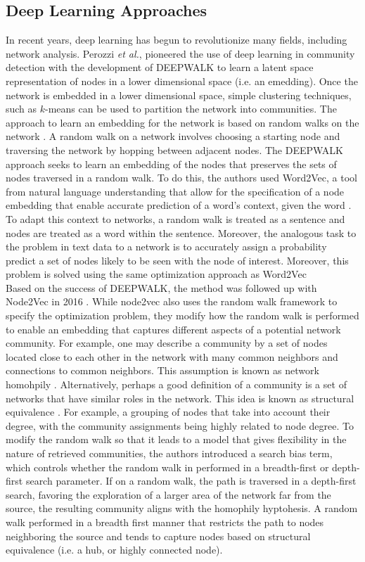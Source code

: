 \subsection{Deep Learning Approaches}
\indent In recent years, deep learning has begun to revolutionize many fields, including network analysis. Perozzi \emph{et al.}, pioneered the use of deep learning in community detection with the development of DEEPWALK \cite{deepWalk} to learn a latent space representation of nodes in a lower dimensional space (i.e. an emedding). Once the network is embedded in a lower dimensional space, simple clustering techniques, such as $k$-means \cite{kMean} can be used to partition the network into communities. The approach to learn an embedding for the network is based on random walks on the network \cite{rWalk,gleichpagerank}. A random walk on a network involves choosing a starting node and traversing the network by hopping between adjacent nodes. The DEEPWALK approach seeks to learn an embedding of the nodes that preserves the sets of nodes traversed in a random walk. To do this, the authors used Word2Vec, a tool from natural language understanding that allow for the specification of a node embedding that enable accurate prediction of a word's context, given the word \cite{word2Vec}. To adapt this context to networks, a random walk is treated as a sentence and nodes are treated as a word within the sentence. Moreover, the analogous task to the problem in text data to a network is to accurately assign a probability predict a set of nodes likely to be seen with the node of interest. Moreover, this problem is solved using the same optimization approach as Word2Vec \\
\indent Based on the success of DEEPWALK, the method was followed up with Node2Vec in 2016 \cite{node2vec}. While node2vec also uses the random walk framework to specify the optimization problem, they modify how the random walk is performed to enable an embedding that captures different aspects of a potential network community. For example, one may describe a community by a set of nodes located close to each other in the network with many common neighbors and connections to common neighbors. This assumption is known as network homohpily \cite{homophily}. Alternatively, perhaps a good definition of a community is a set of networks that have similar roles in the network. This idea is known as structural equivalence \cite{structural}. For example, a grouping of nodes that take into account their degree, with the community assignments being highly related to node degree. To modify the random walk so that it leads to a model that gives flexibility in the nature of retrieved communities, the authors introduced a search bias term, which controls whether the random walk in performed in a breadth-first or depth-first search parameter. If on a random walk, the path is traversed in a depth-first search, favoring the exploration of a larger area of the network far from the source, the resulting community aligns with the homophily hyptohesis. A random walk performed in a breadth first manner that restricts the path to nodes neighboring the source and tends to capture nodes based on structural equivalence (i.e. a hub, or highly connected node). 


